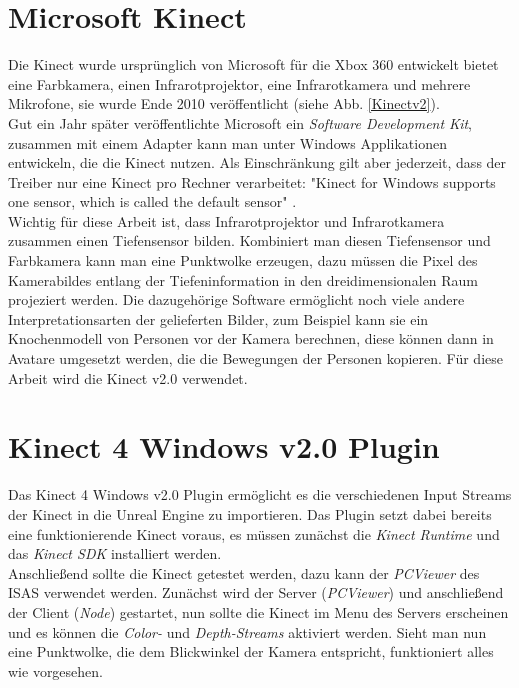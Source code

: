 \documentclass[a4paper]{IEEEtran}
\begin{document}
\section{Microsoft Kinect}
	Die Kinect wurde ursprünglich von Microsoft für die Xbox 360 entwickelt bietet eine Farbkamera, einen Infrarotprojektor, eine Infrarotkamera und mehrere Mikrofone, sie wurde Ende 2010 veröffentlicht (siehe Abb. \ref{Kinectv2}). \\
	Gut ein Jahr später veröffentlichte Microsoft ein \textit{Software Development Kit}, zusammen mit einem Adapter kann man unter Windows Applikationen entwickeln, die die Kinect nutzen.
	Als Einschränkung gilt aber jederzeit, dass der Treiber nur eine Kinect pro Rechner verarbeitet: "{}Kinect for Windows supports one sensor, which is called the default sensor"{} {\cite{kinectone}}.\\
	Wichtig für diese Arbeit ist, dass Infrarotprojektor und Infrarotkamera zusammen einen Tiefensensor bilden. 
	Kombiniert man diesen Tiefensensor und Farbkamera kann man eine Punktwolke erzeugen, dazu müssen die Pixel des Kamerabildes entlang der Tiefeninformation in den dreidimensionalen Raum projeziert werden. 
	Die dazugehörige Software ermöglicht noch viele andere Interpretationsarten der gelieferten Bilder, zum Beispiel kann sie ein Knochenmodell von Personen vor der Kamera berechnen, diese können dann in Avatare umgesetzt werden, die die Bewegungen der Personen kopieren.
	Für diese Arbeit wird die Kinect v2.0 verwendet. \\[0.5cm]
	
	
	
\section{Kinect 4 Windows v2.0 Plugin}
	Das Kinect 4 Windows v2.0 Plugin ermöglicht es die verschiedenen Input Streams der Kinect in die Unreal Engine zu importieren. Das Plugin setzt dabei bereits eine funktionierende Kinect voraus, es müssen zunächst die {\textit{Kinect Runtime}} {\cite{kinectruntime}} und das {\textit{Kinect SDK}} {\cite{kinectsdk}} installiert werden. \\
	Anschließend sollte die Kinect getestet werden, dazu kann der {\textit{PCViewer}} des ISAS verwendet werden. 
	Zunächst wird der Server ({\textit{PCViewer}}) und anschließend der Client ({\textit{Node}}) gestartet, nun sollte die Kinect im Menu des Servers erscheinen und es können die {\textit{Color-}} und {\textit{Depth-Streams}} aktiviert werden. 
	Sieht man nun eine Punktwolke, die dem Blickwinkel der Kamera entspricht, funktioniert alles wie vorgesehen.\\
	
\end{document}
